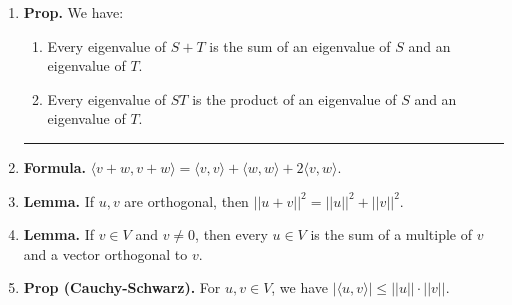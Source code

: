\begin{enumerate}
	\item \textbf{Prop. } We have: 
	\begin{enumerate}
		\item Every eigenvalue of $S+T$ is the sum of an eigenvalue of $S$ and an eigenvalue of $T$. 
		\item Every eigenvalue of $ST$ is the product of an eigenvalue of $S$ and an eigenvalue of $T$. 
	\end{enumerate}
	\begin{center}
		\hrule
	\end{center}
	\item \textbf{Formula. } $\langle v+w, v+w \rangle = \langle v,v \rangle + \langle w,w \rangle + 2\langle v,w \rangle$. 
	\item \textbf{Lemma. } If $u,v$ are orthogonal, then $||u+v||^2 = ||u||^2 + ||v||^2$. 
	\item \textbf{Lemma. } If $v \in V$ and $v \neq 0$, then every $u \in V$ is the sum of a multiple of $v$ and a vector orthogonal to $v$. 
	\item \textbf{Prop (Cauchy-Schwarz). } For $u,v \in V$, we have $|\langle u,v \rangle| \leq ||u|| \cdot ||v||$. 
\end{enumerate}


